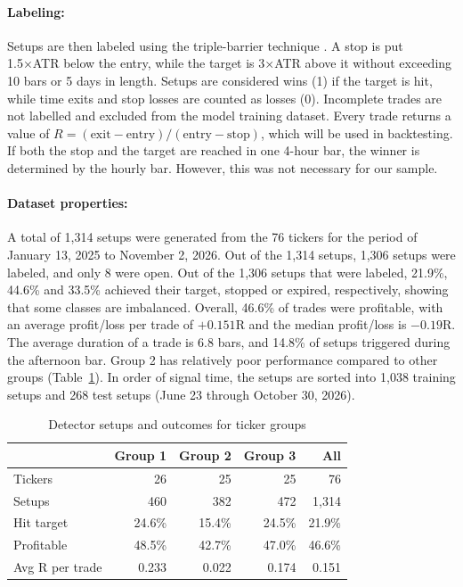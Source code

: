 \documentclass[11pt]{article}
\begin{document}
\paragraph{Labeling:} Setups are then labeled using the triple-barrier technique \citep{lopezdeprado2018advances}. A stop is put 1.5×ATR below the entry, while the target is 3×ATR above it without exceeding 10 bars or 5 days in length. Setups are considered wins (1) if the target is hit, while time exits and stop losses are counted as losses (0). Incomplete trades are not labelled and excluded from the model training dataset. Every trade returns a value of $R = (\text{exit} - \text{entry}) / (\text{entry} - \text{stop})$, which will be used in backtesting. If both the stop and the target are reached in one 4-hour bar, the winner is determined by the hourly bar. However, this was not necessary for our sample.

\paragraph{Dataset properties:} A total of 1,314 setups were generated from the 76 tickers for the period of January 13, 2025 to November 2, 2026. Out of the 1,314 setups, 1,306 setups were labeled, and only 8 were open. Out of the 1,306 setups that were labeled, 21.9\%, 44.6\% and 33.5\% achieved their target, stopped or expired, respectively, showing that some classes are imbalanced. Overall, 46.6\% of trades were profitable, with an average profit/loss per trade of $+0.151$R and the median profit/loss is $-0.19$R. The average duration of a trade is 6.8 bars, and 14.8\% of setups triggered during the afternoon bar. Group 2 has relatively poor performance compared to other groups (Table~\ref{tab:groups}). In order of signal time, the setups are sorted into 1,038 training setups and 268 test setups (June 23 through October 30, 2026).

\begin{table}[t]
  \centering
  \small
  \begin{tabular}{lrrrr}
    \hline
    & \textbf{Group 1} & \textbf{Group 2} & \textbf{Group 3} & \textbf{All} \\
    \hline
    Tickers         & 26     & 25     & 25     & 76     \\
    Setups          & 460    & 382    & 472    & 1,314  \\
    Hit target      & 24.6\% & 15.4\% & 24.5\% & 21.9\% \\
    Profitable      & 48.5\% & 42.7\% & 47.0\% & 46.6\% \\
    Avg R per trade & 0.233  & 0.022  & 0.174  & 0.151  \\
    \hline
  \end{tabular}
  \caption{Detector setups and outcomes for ticker groups}
  \label{tab:groups}
\end{table}
\end{document}
